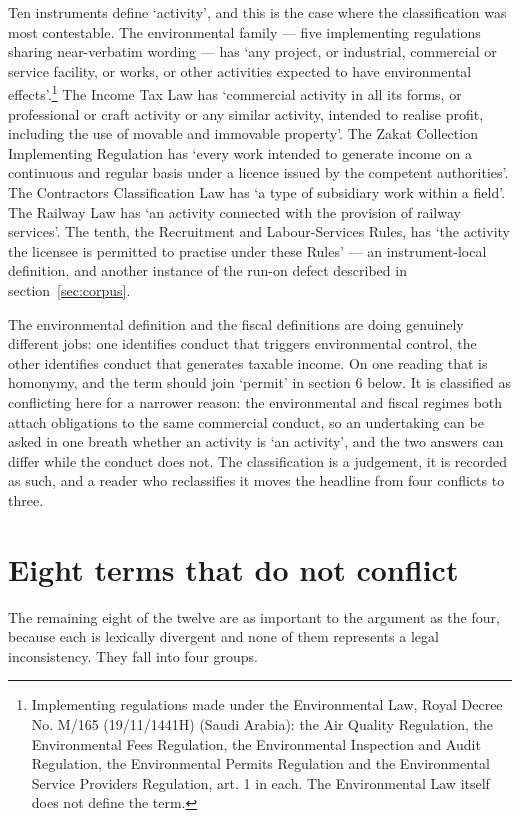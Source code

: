 \documentclass[11pt]{article}
\begin{document}
Ten instruments define `activity', and this is the case where the
classification was most contestable. The environmental family --- five
implementing regulations sharing near-verbatim wording --- has `any project,
or industrial, commercial or service facility, or works, or other activities
expected to have environmental effects'.\footnote{Implementing regulations made under the Environmental Law, Royal Decree No. M/165 (19/11/1441H) (Saudi Arabia): the Air
Quality Regulation, the Environmental Fees Regulation, the Environmental
Inspection and Audit Regulation, the Environmental Permits Regulation and
the Environmental Service Providers Regulation, art. 1 in each. The
Environmental Law itself does not define the term.}
The Income Tax Law has `commercial activity in all its forms, or professional
or craft activity or any similar activity, intended to realise profit,
including the use of movable and immovable property'. The Zakat Collection
Implementing Regulation has `every work intended to generate income on a
continuous and regular basis under a licence issued by the competent
authorities'. The Contractors Classification Law has `a type of subsidiary
work within a field'. The Railway Law has `an activity connected with the
provision of railway services'. The tenth, the Recruitment and
Labour-Services Rules, has `the activity the licensee is permitted to
practise under these Rules' --- an instrument-local definition, and
another instance of the run-on defect described in section~\ref{sec:corpus}.

The environmental definition and the fiscal definitions are doing genuinely
different jobs: one identifies conduct that triggers environmental control,
the other identifies conduct that generates taxable income. On one reading
that is homonymy, and the term should join `permit' in section 6 below. It is
classified as conflicting here for a narrower reason: the environmental and
fiscal regimes both attach obligations to the same commercial conduct, so an
undertaking can be asked in one breath whether an activity is `an activity',
and the two answers can differ while the conduct does not. The classification
is a judgement, it is recorded as such, and a reader who reclassifies it
moves the headline from four conflicts to three.

\section{Eight terms that do not conflict}

The remaining eight of the twelve are as important to the argument as the
four, because each is lexically divergent and none of them represents a legal
inconsistency. They fall into four groups.
\end{document}
